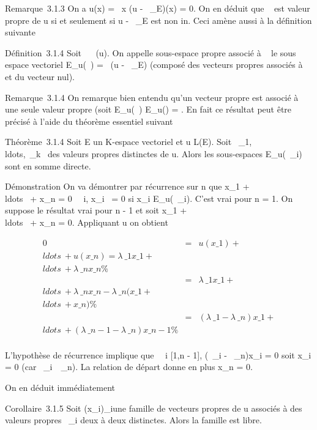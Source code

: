 \documentclass[]{article}
\begin{document}
Remarque~3.1.3 On a u(x) = \lambda~x \Leftrightarrow (u -
\lambda~\mathrmId\_E)(x) = 0. On en déduit que \lambda~ est
valeur propre de u si et seulement si u -
\lambda~\mathrmId\_E est non in\jmathectif. Ceci amène
aussi à la définition suivante

Définition~3.1.4 Soit \lambda~
\in{}~(u). On appelle
sous-espace propre associé à \lambda~ le sous espace vectoriel E\_u(\lambda~)
= \mathrmKer~(u -
\lambda~\mathrmId\_E) (composé des vecteurs propres
associés à \lambda~ et du vecteur nul).

Remarque~3.1.4 On remarque bien entendu qu'un vecteur propre est associé
à une seule valeur propre (soit E\_u(\lambda~) \bigcap E\_u(\mu) =
\0\). En fait ce résultat peut être
précisé à l'aide du théorème essentiel suivant

Théorème~3.1.4 Soit E un K-espace vectoriel et u \in L(E). Soit
\lambda~\_1,\\ldots,\lambda~\_k~
des valeurs propres distinctes de u. Alors les sous-espaces
E\_u(\lambda~\_i) sont en somme directe.

Démonstration On va démontrer par récurrence sur n que x\_1 +
\\ldots~ +
x\_n = 0 \rigtharrow~\forall~i, x\_i~ = 0 si
x\_i \in E\_u(\lambda~\_i). C'est vrai pour n = 1. On
suppose le résultat vrai pour n - 1 et soit x\_1 +
\\ldots~ +
x\_n = 0. Appliquant u on obtient

\begin{align*} 0& =& u(x\_1) +
\\ldots~ +
u(x\_n) = \lambda~\_1x\_1 +
\\ldots~ +
\lambda~\_nx\_n\%& \\ & =&
\lambda~\_1x\_1 +
\\ldots~ +
\lambda~\_nx\_n - \lambda~\_n(x\_1 +
\\ldots~ +
x\_n) \%& \\ & =& (\lambda~\_1
- \lambda~\_n)x\_1 +
\\ldots~ +
(\lambda~\_n-1 - \lambda~\_n)x\_n-1 \%&
\\ \end{align*}

L'hypothèse de récurrence implique que \forall~~i \in
{[}1,n - 1{]}, (\lambda~\_i - \lambda~\_n)x\_i = 0 soit
x\_i = 0 (car
\lambda~\_i\neq~\lambda~\_n). La relation de
départ donne en plus x\_n = 0.

On en déduit immédiatement

Corollaire~3.1.5 Soit (x\_i)\_i\inI une famille de
vecteurs propres de u associés à des valeurs propres \lambda~\_i deux à
deux distinctes. Alors la famille est libre.
\end{document}
